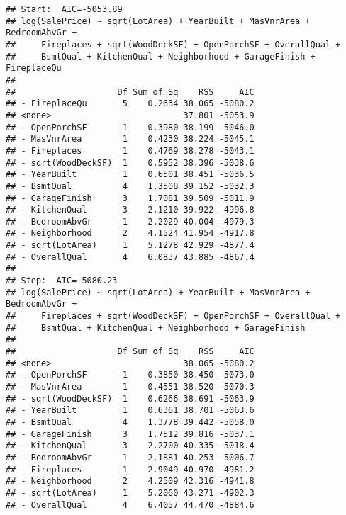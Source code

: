 \documentclass[
]{article}
\begin{document}
\begin{verbatim}
## Start:  AIC=-5053.89
## log(SalePrice) ~ sqrt(LotArea) + YearBuilt + MasVnrArea + BedroomAbvGr + 
##     Fireplaces + sqrt(WoodDeckSF) + OpenPorchSF + OverallQual + 
##     BsmtQual + KitchenQual + Neighborhood + GarageFinish + FireplaceQu
## 
##                    Df Sum of Sq    RSS     AIC
## - FireplaceQu       5    0.2634 38.065 -5080.2
## <none>                          37.801 -5053.9
## - OpenPorchSF       1    0.3980 38.199 -5046.0
## - MasVnrArea        1    0.4230 38.224 -5045.1
## - Fireplaces        1    0.4769 38.278 -5043.1
## - sqrt(WoodDeckSF)  1    0.5952 38.396 -5038.6
## - YearBuilt         1    0.6501 38.451 -5036.5
## - BsmtQual          4    1.3508 39.152 -5032.3
## - GarageFinish      3    1.7081 39.509 -5011.9
## - KitchenQual       3    2.1210 39.922 -4996.8
## - BedroomAbvGr      1    2.2029 40.004 -4979.3
## - Neighborhood      2    4.1524 41.954 -4917.8
## - sqrt(LotArea)     1    5.1278 42.929 -4877.4
## - OverallQual       4    6.0837 43.885 -4867.4
## 
## Step:  AIC=-5080.23
## log(SalePrice) ~ sqrt(LotArea) + YearBuilt + MasVnrArea + BedroomAbvGr + 
##     Fireplaces + sqrt(WoodDeckSF) + OpenPorchSF + OverallQual + 
##     BsmtQual + KitchenQual + Neighborhood + GarageFinish
## 
##                    Df Sum of Sq    RSS     AIC
## <none>                          38.065 -5080.2
## - OpenPorchSF       1    0.3850 38.450 -5073.0
## - MasVnrArea        1    0.4551 38.520 -5070.3
## - sqrt(WoodDeckSF)  1    0.6266 38.691 -5063.9
## - YearBuilt         1    0.6361 38.701 -5063.6
## - BsmtQual          4    1.3778 39.442 -5058.0
## - GarageFinish      3    1.7512 39.816 -5037.1
## - KitchenQual       3    2.2700 40.335 -5018.4
## - BedroomAbvGr      1    2.1881 40.253 -5006.7
## - Fireplaces        1    2.9049 40.970 -4981.2
## - Neighborhood      2    4.2509 42.316 -4941.8
## - sqrt(LotArea)     1    5.2060 43.271 -4902.3
## - OverallQual       4    6.4057 44.470 -4884.6
\end{verbatim}
\end{document}
